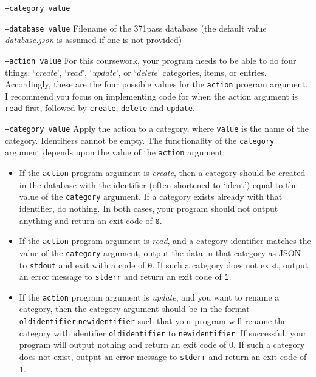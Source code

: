 \documentclass[a4paper]{article}
\begin{document}
\begin{labeling}{ \texttt{--category value} }
    \item[\texttt{--database value}]
    Filename of the 371pass database (the default value \emph{database.json} is assumed if one is not provided)

    \item[\texttt{--action value}]
    For this coursework, your program needs to be able to do four things: `\emph{create}', `\emph{read}', `\emph{update}', or `\emph{delete}' categories, items, or entries. Accordingly, these are the four possible values for the \texttt{action} program argument. I recommend you focus on implementing code for when the action argument is \texttt{read} first, followed by \texttt{create}, \texttt{delete} and \texttt{update}.

    \item[\texttt{--category value}]
    Apply the action to a category, where \texttt{value} is the name of the category. Identifiers cannot be empty. The functionality of the \texttt{category} argument depends upon the value of the \texttt{action} argument:
        \begin{itemize}
    
        \item If the \texttt{action} program argument is \emph{create}, then a category should be created in the database with the identifier (often shortened to `ident') equal to the value of the \texttt{category} argument. If a category exists already with that identifier, do nothing. In both cases, your program should not output anything and return an exit code of \texttt{0}.
    
        \item If the \texttt{action} program argument is \emph{read}, and a category identifier matches the value of the \texttt{category} argument, output the data in that category as JSON to \texttt{stdout} and exit with a code of \texttt{0}. If such a category does not exist, output an error message to \texttt{stderr} and return an exit code of \texttt{1}.
    
        \item If the \texttt{action} program argument is \emph{update}, and you want to rename a category, then the category argument should be in the format \\\texttt{oldidentifier}:\texttt{newidentifier} such that your program will rename the category with identifier \texttt{oldidentifier} to \texttt{newidentifier}. If successful, your program will output nothing and return an exit code of 0. If such a category does not exist, output an error message to \texttt{stderr} and return an exit code of \texttt{1}.
    

\end{itemize}
\end{labeling}
\end{document}
